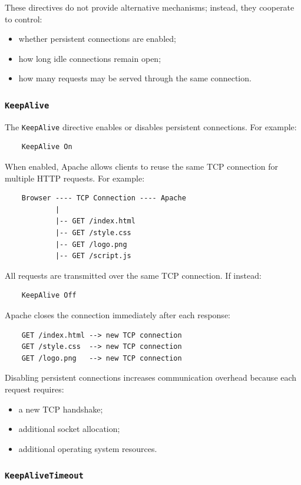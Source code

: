 \documentclass{scrbook}
\begin{document}
	These directives do not provide alternative mechanisms; instead, they cooperate to control:
	\begin{itemize}
		\item whether persistent connections are enabled;
		\item how long idle connections remain open;
		\item how many requests may be served through the same connection.
	\end{itemize}
	
	\subsubsection{\texttt{KeepAlive}}
	
	The \texttt{KeepAlive} directive enables or disables persistent connections. For example:
	\begin{lstlisting}
	KeepAlive On
	\end{lstlisting}
	
	When enabled, Apache allows clients to reuse the same TCP connection for multiple HTTP requests. For example:
	\begin{lstlisting}
	Browser ---- TCP Connection ---- Apache
			|
			|-- GET /index.html
			|-- GET /style.css
			|-- GET /logo.png
			|-- GET /script.js
	\end{lstlisting}
	
	All requests are transmitted over the same TCP connection. If instead:
	\begin{lstlisting}
	KeepAlive Off
	\end{lstlisting}
	
	Apache closes the connection immediately after each response:
	
	\begin{lstlisting}
	GET /index.html --> new TCP connection
	GET /style.css  --> new TCP connection
	GET /logo.png   --> new TCP connection
	\end{lstlisting}
	
	Disabling persistent connections increases communication overhead because each request requires:
	\begin{itemize}
		\item a new TCP handshake;
		\item additional socket allocation;
		\item additional operating system resources.
	\end{itemize}
	
	\subsubsection{\texttt{KeepAliveTimeout}}
	
\end{document}
